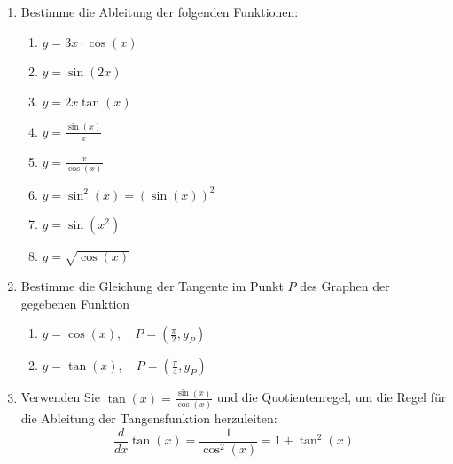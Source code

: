 \clearpage
\begin{ueb}
	{}{}
	\begin{enumerate}
		\item Bestimme die Ableitung der folgenden Funktionen:
		      \begin{enumerate}
			      \item $y= 3x\cdot \cos(x)$
			      \item $y= \sin(2x)$
			      \item $y= 2x\tan(x)$
			      \item $y= \frac{\sin(x)}{x}$
			      \item $ y= \frac{x}{\cos(x)}$
			      \item $y =\sin^2(x) = (\sin(x))^2$
			      \item $y = \sin(x^2)$
			      \item $y=\sqrt{\cos(x)}$
		      \end{enumerate}
		\item Bestimme die Gleichung der Tangente im Punkt $P$ des Graphen der gegebenen Funktion
		      \begin{enumerate}
			      \item $ y= \cos(x), \quad P=\left(\frac{\pi}{2}, y_P\right)$
			      \item $ y= \tan(x), \quad P=\left(\frac{\pi}{4}, y_P\right)$
		      \end{enumerate}
		\item Verwenden Sie $\tan(x) = \frac{\sin(x)}{\cos(x)}$ und die Quotientenregel, um die Regel für die Ableitung der Tangensfunktion herzuleiten:
		      $$
			      \frac{d}{dx}\tan(x) = \frac{1}{\cos^2(x)} = 1+ \tan^2(x)
		      $$
	\end{enumerate}
\end{ueb}

